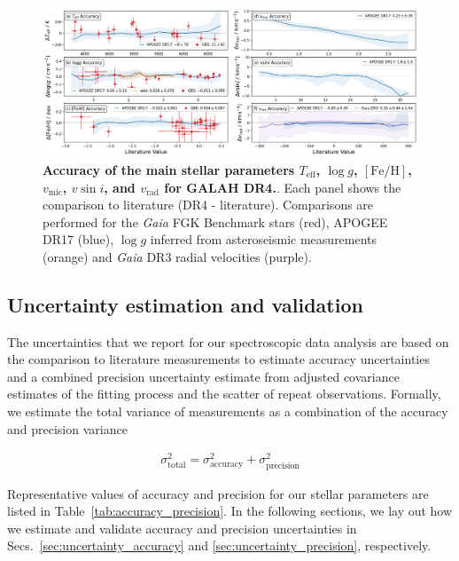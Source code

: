 \documentclass[
  journal=pasa,
  manuscript=research-paper, %
  year=2024,
  volume=37
]{cup-journal}
\newcommand{\Teff}{$T_\mathrm{eff}$\xspace}
\newcommand{\logg}{$\log g$\xspace}
\newcommand{\feh}{$\mathrm{[Fe/H]}$\xspace}
\newcommand{\vmic}{$v_\mathrm{mic}$\xspace}
\newcommand{\vsini}{$v \sin i$\xspace}
\newcommand{\vrad}{$v_\mathrm{rad}$\xspace}
\newcommand{\Gaia}{\textit{Gaia}\xspace}
\begin{document}
\begin{figure}[ht]
 \centering
 \includegraphics[width=\textwidth]{figures/galah_dr4_validation_parameter_accuracy_allstar.png}
 \caption{\textbf{Accuracy of the main stellar parameters \Teff, \logg, \feh, \vmic, \vsini, and \vrad for GALAH DR4.}. Each panel shows the comparison to literature (DR4 - literature). Comparisons are performed for the \Gaia FGK Benchmark stars (red), APOGEE DR17 (blue), \logg inferred from asteroseismic measurements (orange) and \Gaia DR3 radial velocities (purple).}
 \label{fig:galah_dr4_validation_parameter_accuracy_allstar}
\end{figure}

\subsection{Uncertainty estimation and validation}
\label{sec:uncertainty}

The uncertainties that we report for our spectroscopic data analysis are based on the comparison to literature measurements to estimate accuracy uncertainties and a combined precision uncertainty estimate from adjusted covariance estimates of the fitting process and the scatter of repeat observations. Formally, we estimate the total variance of measurements as a combination of the accuracy and precision variance

\begin{align} \label{eq:total_uncertainty}
    \sigma_\mathrm{total}^2 = \sigma_\mathrm{accuracy}^2 + \sigma_\mathrm{precision}^2
\end{align}

Representative values of accuracy and precision for our stellar parameters are listed in Table~\ref{tab:accuracy_precision}. In the following sections, we lay out how we estimate and validate accuracy and precision uncertainties in Secs.~\ref{sec:uncertainty_accuracy} and \ref{sec:uncertainty_precision}, respectively.
\end{document}
